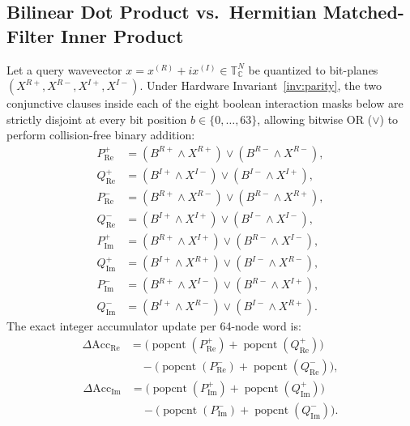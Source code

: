 \documentclass[10pt, twocolumn, a4paper]{article}
\begin{document}
\subsection{Bilinear Dot Product vs.\ Hermitian Matched-Filter Inner Product}
Let a query wavevector $x = x^{(R)} + i x^{(I)} \in \mathbb{T}_{\mathbb{C}}^N$ be quantized to bit-planes $(X^{R+}, X^{R-}, X^{I+}, X^{I-})$. Under Hardware Invariant~\ref{inv:parity}, the two conjunctive clauses inside each of the eight boolean interaction masks below are strictly disjoint at every bit position $b \in \{0, \dots, 63\}$, allowing bitwise OR ($\lor$) to perform collision-free binary addition:
\begin{equation}
\begin{aligned}
P_{\text{Re}}^+ &= (B^{R+} \!\land\! X^{R+}) \lor (B^{R-} \!\land\! X^{R-}), \\
Q_{\text{Re}}^+ &= (B^{I+} \!\land\! X^{I-}) \lor (B^{I-} \!\land\! X^{I+}), \\
P_{\text{Re}}^- &= (B^{R+} \!\land\! X^{R-}) \lor (B^{R-} \!\land\! X^{R+}), \\
Q_{\text{Re}}^- &= (B^{I+} \!\land\! X^{I+}) \lor (B^{I-} \!\land\! X^{I-}), \\
P_{\text{Im}}^+ &= (B^{R+} \!\land\! X^{I+}) \lor (B^{R-} \!\land\! X^{I-}), \\
Q_{\text{Im}}^+ &= (B^{I+} \!\land\! X^{R+}) \lor (B^{I-} \!\land\! X^{R-}), \\
P_{\text{Im}}^- &= (B^{R+} \!\land\! X^{I-}) \lor (B^{R-} \!\land\! X^{I+}), \\
Q_{\text{Im}}^- &= (B^{I+} \!\land\! X^{R-}) \lor (B^{I-} \!\land\! X^{R+}).
\end{aligned}
\label{eq:mask_re_pos}
\end{equation}
The exact integer accumulator update per 64-node word is:
\begin{equation}
\begin{split}
\Delta \text{Acc}_{\text{Re}} &= \big(\operatorname{popcnt}(P_{\text{Re}}^+) + \operatorname{popcnt}(Q_{\text{Re}}^+)\big) \\
&\quad - \big(\operatorname{popcnt}(P_{\text{Re}}^-) + \operatorname{popcnt}(Q_{\text{Re}}^-)\big),
\end{split}
\label{eq:acc_re}
\end{equation}
\begin{equation}
\begin{split}
\Delta \text{Acc}_{\text{Im}} &= \big(\operatorname{popcnt}(P_{\text{Im}}^+) + \operatorname{popcnt}(Q_{\text{Im}}^+)\big) \\
&\quad - \big(\operatorname{popcnt}(P_{\text{Im}}^-) + \operatorname{popcnt}(Q_{\text{Im}}^-)\big).
\end{split}
\label{eq:acc_im}
\end{equation}
\end{document}
